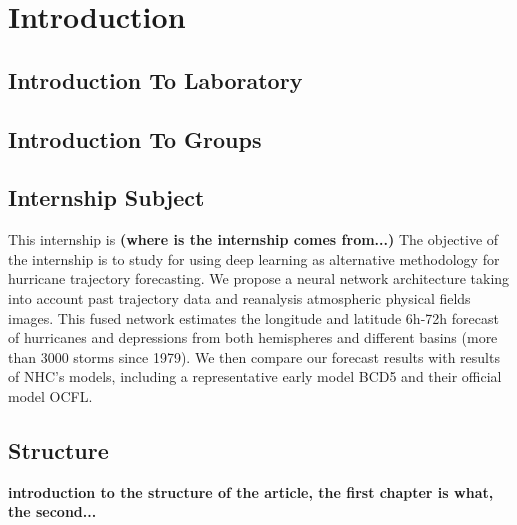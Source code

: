 \chapter{Introduction}
\label{sec:intro}

\section{Introduction To Laboratory}
\label{sec:laboratory}

\section{Introduction To Groups}
\label{groups}

\section{Internship Subject}
\label{sec:subject}
This internship is \textbf{(where is the internship comes from...)} The objective of the internship is to study for using deep learning as alternative methodology for hurricane trajectory forecasting. We propose a neural network architecture taking into account past trajectory data and reanalysis atmospheric physical fields images. This fused network estimates the longitude and latitude 6h-72h forecast of hurricanes and depressions from both hemispheres and different basins (more than 3000 storms since 1979). We then compare our forecast results with results of NHC's models, including a representative early model BCD5 and their official model OCFL. 


\section{Structure}
\textbf{introduction to the structure of the article, the first chapter is what, the second...}



